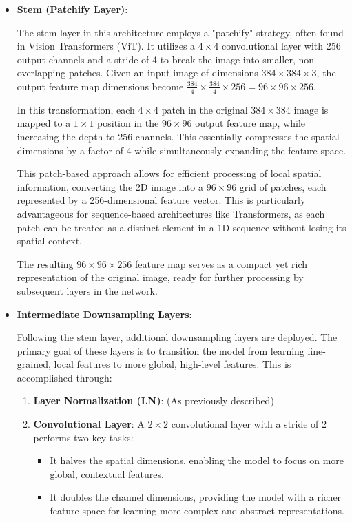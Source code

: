 \documentclass[a4paper,12pt,openright]{book}
\begin{document}
\begin{itemize}
     \item \textbf{Stem (Patchify Layer)}:
     
   The stem layer in this architecture employs a "patchify" strategy, often found in Vision Transformers (ViT). It utilizes a \(4 \times 4\) convolutional layer with 256 output channels and a stride of 4 to break the image into smaller, non-overlapping patches. Given an input image of dimensions \(384 \times 384 \times 3\), the output feature map dimensions become \( \frac{384}{4} \times \frac{384}{4} \times 256 = 96 \times 96 \times 256 \).
    
    In this transformation, each \(4 \times 4\) patch in the original \(384 \times 384\) image is mapped to a \(1 \times 1\) position in the \(96 \times 96\) output feature map, while increasing the depth to 256 channels. This essentially compresses the spatial dimensions by a factor of 4 while simultaneously expanding the feature space.
    
    This patch-based approach allows for efficient processing of local spatial information, converting the 2D image into a \(96 \times 96\) grid of patches, each represented by a 256-dimensional feature vector. This is particularly advantageous for sequence-based architectures like Transformers, as each patch can be treated as a distinct element in a 1D sequence without losing its spatial context. 
    
    The resulting \(96 \times 96 \times 256\) feature map serves as a compact yet rich representation of the original image, ready for further processing by subsequent layers in the network.
 \item \textbf{Intermediate Downsampling Layers}:

Following the stem layer, additional downsampling layers are deployed. The primary goal of these layers is to transition the model from learning fine-grained, local features to more global, high-level features. This is accomplished through:

\begin{enumerate}
    \item \textbf{Layer Normalization (LN)}: (As previously described)
    
    \item \textbf{Convolutional Layer}: A \(2 \times 2\) convolutional layer with a stride of 2 performs two key tasks:
    \begin{itemize}
        \item It halves the spatial dimensions, enabling the model to focus on more global, contextual features.
        \item It doubles the channel dimensions, providing the model with a richer feature space for learning more complex and abstract representations.
    \end{itemize}
\end{enumerate}


\end{itemize}
\end{document}
